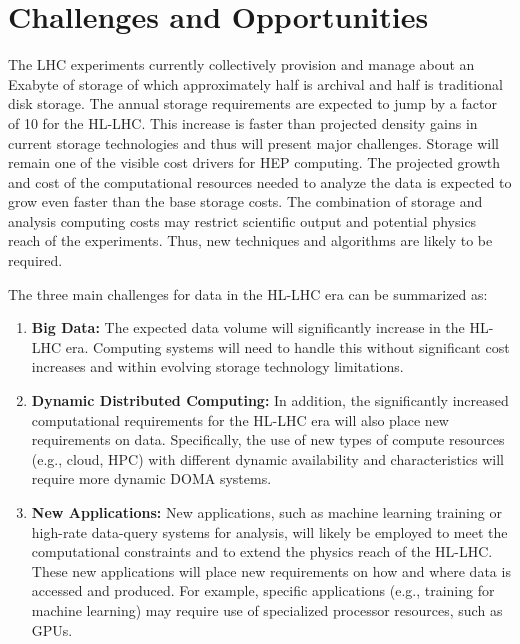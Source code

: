 \documentclass[12pt,a4paper]{article}
\begin{document}
\section{Challenges and
Opportunities}\label{challenges-and-opportunities}

The LHC experiments currently collectively provision and manage about an Exabyte of
storage of which approximately half is archival and half is
traditional disk storage. The annual storage requirements are expected
to jump by a factor of 10 for the HL-LHC. This increase is faster than
projected density gains in current storage technologies and thus will present major challenges. Storage
will remain one of the visible cost drivers for HEP computing. The projected growth and cost of the computational resources needed to
analyze the data is expected to grow even faster than the base
storage costs. The combination of storage and analysis computing costs
may restrict scientific output and potential physics reach of the
experiments. Thus, new techniques and algorithms are likely to be
required.

The three main challenges for data in the HL-LHC era can be
summarized as:

\begin{enumerate}
\def\labelenumi{\arabic{enumi}.}
\item \textbf{Big Data:} The expected data volume will significantly increase in the HL-LHC era. Computing systems will need to
  handle this without significant cost increases and within evolving
  storage technology limitations.
\item \textbf{Dynamic Distributed Computing:} In addition, the significantly
  increased computational requirements for the HL-LHC era will also
  place new requirements on data. Specifically, the use of new types of
  compute resources (e.g., cloud, HPC) with different dynamic %
  availability and characteristics will require more dynamic
  DOMA systems.
\item \textbf{New Applications:} New applications, such as machine learning
  training or high-rate data-query systems for analysis, will likely be
  employed to meet the computational constraints and to extend the
  physics reach of the HL-LHC. These new applications will place new
  requirements on how and where data is accessed and produced. For
  example, specific applications (e.g., training for machine learning)
  may require use of specialized processor resources, such as GPUs.
\end{enumerate}
\end{document}
